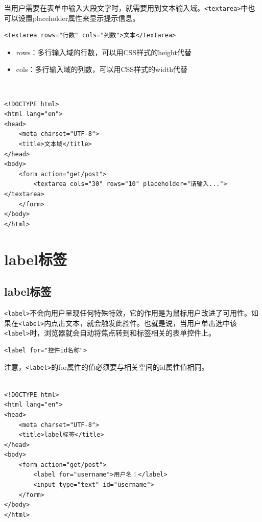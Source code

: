 当用户需要在表单中输入大段文字时，就需要用到文本输入域。\lstinline|<textarea>|中也可以设置placeholder属性来显示提示信息。 \\

\begin{lstlisting}[style=htmlcssjs]
<textarea rows="行数" cols="列数">文本</textarea>
\end{lstlisting}

\begin{itemize}
    \item rows：多行输入域的行数，可以用CSS样式的height代替
    \item cols：多行输入域的列数，可以用CSS样式的width代替
\end{itemize}

 \\
\begin{lstlisting}[style=htmlcssjs]
<!DOCTYPE html>
<html lang="en">
<head>
    <meta charset="UTF-8">
    <title>文本域</title>
</head>
<body>
    <form action="get/post">
        <textarea cols="30" rows="10" placeholder="请输入..."></textarea>
    </form>
</body>
</html>
\end{lstlisting}

\newpage

\section{label标签}

\subsection{label标签}

\lstinline|<label>|不会向用户呈现任何特殊特效，它的作用是为鼠标用户改进了可用性。如果在\lstinline|<label>|内点击文本，就会触发此控件。也就是说，当用户单击选中该\lstinline|<label>|时，浏览器就会自动将焦点转到和标签相关的表单控件上。

\begin{lstlisting}[style=htmlcssjs]
<label for="控件id名称">
\end{lstlisting}

注意，\lstinline|<label>|的for属性的值必须要与相关空间的id属性值相同。 \\

 \\
\begin{lstlisting}[style=htmlcssjs]
<!DOCTYPE html>
<html lang="en">
<head>
    <meta charset="UTF-8">
    <title>label标签</title>
</head>
<body>
    <form action="get/post">
        <label for="username">用户名：</label>
        <input type="text" id="username">
    </form>
</body>
</html>
\end{lstlisting}

